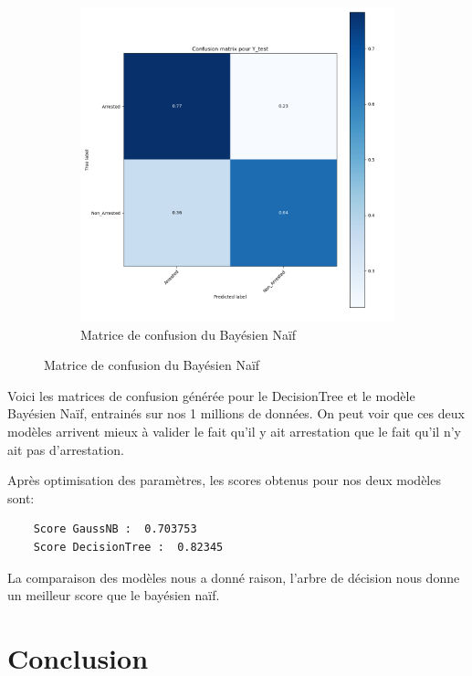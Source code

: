 \documentclass{article}
\begin{document}
\begin{figure}[H]
\begin{subfigure}{.45\textwidth}
		    \includegraphics[scale=.35]{images/MatriceConfusionGauss.png}
		    \caption{Matrice de confusion du Bayésien Naïf}
	    \end{subfigure}
    \end{figure}

    Voici les matrices de confusion générée pour le DecisionTree et le modèle Bayésien Naïf,
    entrainés sur nos 1 millions de données. On peut voir que ces deux modèles arrivent 
    mieux à valider le fait qu'il y ait arrestation que le fait qu'il n'y ait pas d'arrestation.

    Après optimisation des paramètres, les scores obtenus pour nos deux modèles sont:
    \begin{Verbatim}
    Score GaussNB :  0.703753
    Score DecisionTree :  0.82345
    \end{Verbatim}

    La comparaison des modèles nous a donné raison, l'arbre de décision nous donne
    un meilleur score que le bayésien naïf.

    \section{Conclusion}
\end{document}
